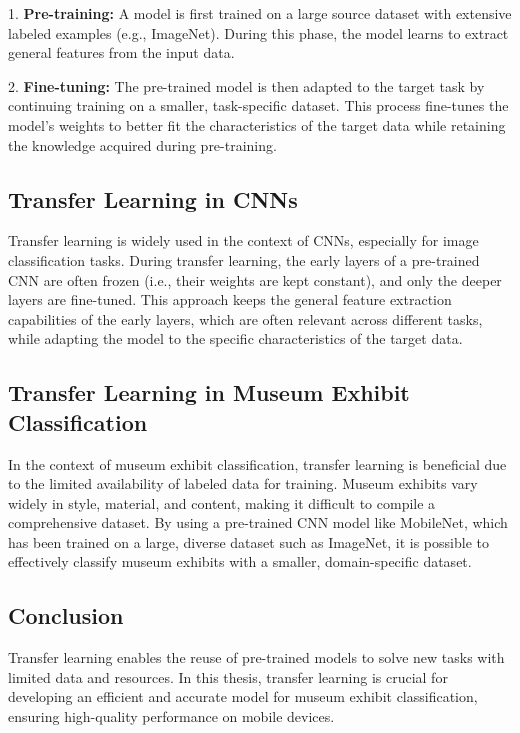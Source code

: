 1. \textbf{Pre-training:} A model is first trained on a large source dataset with extensive labeled examples (e.g., ImageNet). During this phase, the model learns to extract general features from the input data.

2. \textbf{Fine-tuning:} The pre-trained model is then adapted to the target task by continuing training on a smaller, task-specific dataset. This process fine-tunes the model's weights to better fit the characteristics of the target data while retaining the knowledge acquired during pre-training.

\subsection{Transfer Learning in CNNs}

Transfer learning is widely used in the context of CNNs, especially for image classification tasks. During transfer learning, the early layers of a pre-trained CNN are often frozen (i.e., their weights are kept constant), and only the deeper layers are fine-tuned. This approach keeps the general feature extraction capabilities of the early layers, which are often relevant across different tasks, while adapting the model to the specific characteristics of the target data.

\subsection{Transfer Learning in Museum Exhibit Classification}

In the context of museum exhibit classification, transfer learning is beneficial due to the limited availability of labeled data for training. Museum exhibits vary widely in style, material, and content, making it difficult to compile a comprehensive dataset. By using a pre-trained CNN model like MobileNet, which has been trained on a large, diverse dataset such as ImageNet, it is possible to effectively classify museum exhibits with a smaller, domain-specific dataset.

\subsection{Conclusion}

Transfer learning enables the reuse of pre-trained models to solve new tasks with limited data and resources. In this thesis, transfer learning is crucial for developing an efficient and accurate model for museum exhibit classification, ensuring high-quality performance on mobile devices.
